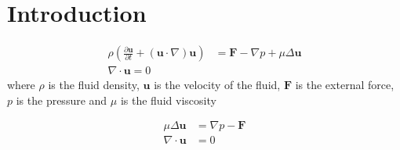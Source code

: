 \section{Introduction}


\begin{equation}
\label{eq:NavierStokes}
\begin{aligned}
    \rho \left(\frac{\partial \mathbf{u}}{\partial t}+(\mathbf{u} \cdot \nabla) \mathbf{u}\right) &= \mathbf{F}-\nabla p+\mu  \Delta \mathbf{u}\\
    \nabla\cdot\mathbf{u} = 0
\end{aligned}
\end{equation}
where $\rho$ is the fluid density, $\mathbf{u}$ is the velocity of the fluid, $\mathbf{F}$ is the external force, $p$ is the pressure and $\mu$ is the fluid viscosity

\begin{subequations}
\label{eq:StokesFlow}
\begin{align}
    \mu\Delta\boldsymbol{u} &= \nabla p - \boldsymbol{F} \label{eq:StokesFlow1} \\ 
    \nabla \cdot \boldsymbol{u} &= 0 \label{eq:StokesFlow2}
\end{align}
\end{subequations}